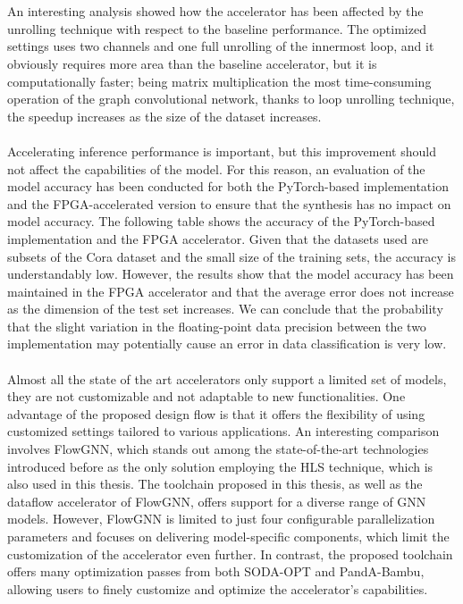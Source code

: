 \documentclass{article}
\begin{document}
\\
\\
\noindent
An interesting analysis showed how the accelerator has been affected by the unrolling technique with respect to the baseline performance. 
The optimized settings uses two channels and one full unrolling of the innermost loop, and it obviously requires more area than the baseline accelerator, but it is computationally faster; being matrix multiplication the most time-consuming operation of the graph convolutional network, thanks to loop unrolling technique, the speedup increases as the size of the dataset increases. 
\\
\\
\noindent
Accelerating inference performance is important, but this improvement should not affect the capabilities of the model. For this reason, an evaluation of the model accuracy has been conducted for both the PyTorch-based implementation and the FPGA-accelerated version to ensure that the synthesis has no impact on model accuracy. 
The following table shows the accuracy of the PyTorch-based implementation and the FPGA accelerator. Given that the datasets used are subsets of the Cora dataset and the small size of the training sets, the accuracy is understandably low. 
However, the results show that the model accuracy has been maintained in the FPGA accelerator and that the average error does not increase as the dimension of the test set increases. 
We can conclude that the probability that the slight variation in the floating-point data precision between the two implementation may potentially cause an error in data classification is very low. 
\\
\\
\noindent
Almost all the state of the art accelerators only support a limited set of models, they are not customizable and not adaptable to new functionalities. 
One advantage of the proposed design flow is that it offers the flexibility of using customized settings tailored to various applications.
An interesting comparison involves FlowGNN, which stands out among the state-of-the-art technologies introduced before as the only solution employing the HLS technique, which is also used in this thesis.
The toolchain proposed in this thesis, as well as the dataflow accelerator of FlowGNN, offers support for a diverse range of GNN models. 
However, FlowGNN is limited to just four configurable parallelization parameters and focuses on delivering model-specific components, which limit the customization of the accelerator even further. 
In contrast, the proposed toolchain offers many optimization passes from both SODA-OPT and PandA-Bambu, allowing users to finely customize and optimize the accelerator’s capabilities. 
\end{document}
